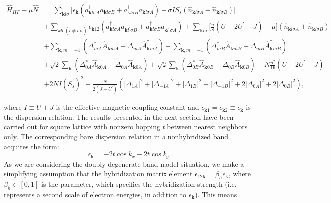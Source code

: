 \documentclass[aps,prb,showpacs,reprint]{revtex4-1}
\begin{document}
\begin{widetext}
\begin{equation}
\begin{split}
\hat{H}_{HF}-\mu \hat{N}&=\sum_{\mathbf{k}l\sigma}\bigg[\epsilon_{\mathbf{k}}(a^
{ \dagger } _ { \mathbf{k}l\sigma
A}a_{\mathbf{k}l\sigma B} +
a^{\dagger}_{\mathbf{k}l\sigma B}a_{\mathbf{k}l\sigma
A})-\sigma I\bar{S}^z_s(\hat{n}_{\mathbf{k}l\sigma
A}-\hat{n}_{\mathbf{k}l\sigma B}) \bigg]\\
&+\sum_{kll^{\prime}(l\neq l^{\prime} \sigma)}
\epsilon_{\mathbf{k}12}(a^{\dagger}_{\mathbf{k}l\sigma
A}a_{\mathbf{k}l^{\prime}\sigma B} +
a^{\dagger}_{\mathbf{k}l\sigma B}a_{\mathbf{k}l^{\prime}\sigma
A})+\sum_{\mathbf{k}l\sigma}\bigg[\frac{n}{8}(U+2U^{\prime}
-J)-\mu\bigg ] (\hat { n } _ {
\mathbf{k}l\sigma A}+\hat{n}_{\mathbf{k}l\sigma B})\\
&+\sum_{\mathbf{k},m=\pm
1}(\Delta_{mA}^*\hat{A}_{\mathbf{k}mA}+\Delta_{mA}\hat{A}^{\dagger}_{\mathbf{k}mA} )+\sum_ {\mathbf{k},m=\pm
1}(\Delta_{mB}^*\hat{A}_{\mathbf{k}mB}+\Delta_{mB}\hat{A}^{\dagger}_
{ \mathbf{k}mB})\\
&+\sqrt{2}\sum_{\mathbf{k}}(\Delta_{0A}^*\hat{A}_{\mathbf{k}0A}+\Delta_{0A}\hat
{A}^{\dagger}_{\mathbf{k} 0A} )+\sqrt{2}\sum_
{\mathbf{k}}(\Delta_{0B}^*\hat{A}_{\mathbf{k}0B}+\Delta_{0B}\hat{A}^{\dagger}_
{ \mathbf{k}0B})-N\frac{n^2}{16}(U+2U^{\prime}
-J)\\
&+2NI(\bar{S}^z_s)^2-\frac{N}{2(J-U^{\prime})}(|\Delta_{1A}|^2+|\Delta_{-1A}
|^2+|\Delta_ { 1B }
|^2+|\Delta_{-1B}
|^2+2|\Delta_{0A}|^2+2|\Delta_{0B}|^2),
\end{split}
\label{eq:H_HF}
\end{equation}
\end{widetext}
where $I\equiv U+J$ is the effective magnetic coupling constant and
$\epsilon_{\mathbf{k}1}=\epsilon_{\mathbf{k}2}\equiv
\epsilon_{\mathbf{k}}$ is the dispersion relation. The results presented in the
next section have been carried out for square lattice with
nonzero hopping $t$ between nearest neighbors only. The corresponding bare
dispersion relation in a nonhybridized band acquires the form:
\begin{equation}
 \epsilon_{\mathbf{k}}=-2t\cos k_x - 2t\cos k_y.
\end{equation}
As we are considering the doubly degenerate band model situation, we make a
simplifying assumption that the hybridization matrix element
$\epsilon_{12\mathbf{k}}=\beta_h\epsilon_{\mathbf{k}}$, where $\beta_h \in
[0,1]$ is the parameter, which specifies the hybridization strength (i.e. represents a second scale of electron energies, in addition to $\epsilon_{\mathbf{k}}$). This means
\end{document}
